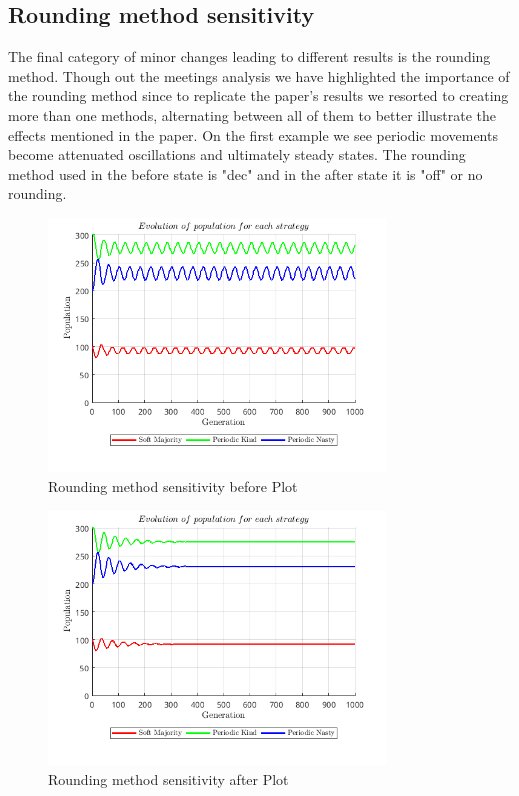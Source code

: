 \documentclass[12pt]{article}
\begin{document}
\subsection{Rounding method sensitivity}
The final category of minor changes leading to different results is the rounding method. Though out the meetings analysis we have highlighted the importance of the rounding method since to replicate the paper's results we resorted to creating more than one methods, alternating between all of them to better illustrate the effects mentioned in the paper. On the first example we see periodic movements become attenuated oscillations and ultimately steady states. The rounding method used in the before state is "dec" and in the after state it is "off" or no rounding.
\begin{figure}[H]
    \centering
    \includegraphics[width=0.8\textwidth]{media/rounding_method_sensitivity_before_dec.png}
    \caption{Rounding method sensitivity before Plot}
\end{figure}
\begin{figure}[H]
    \centering
    \includegraphics[width=0.8\textwidth]{media/rounding_method_sensitivity_after_off.png}
    \caption{Rounding method sensitivity after Plot}
\end{figure}
\end{document}
